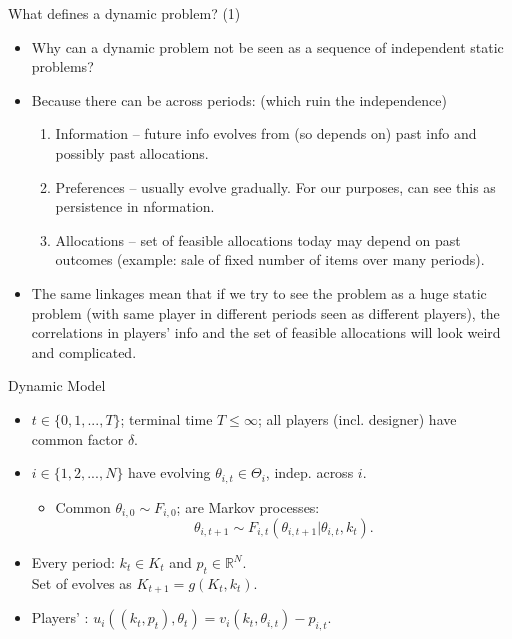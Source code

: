 \documentclass[english,10pt
,aspectratio=169
]{beamer}
\begin{document}
\begin{frame}{What defines a dynamic problem? (1)}
\begin{itemize}
	\item Why can a dynamic problem not be seen as a sequence of independent static problems? 
	
	\item Because there can be  across periods: (which ruin the independence)
	\begin{enumerate}
		\item \alert{Information} -- future info evolves from (so depends on) past info and possibly past allocations.
		\item \alert{Preferences} -- usually evolve gradually. For our purposes, can see this as persistence in nformation.
		\item \alert{Allocations} -- set of feasible allocations today may depend on past outcomes (example: sale of fixed number of items over many periods).
	\end{enumerate}

	\item The same linkages mean that if we try to see the problem as a huge static problem (with same player in different periods seen as different players), the correlations in players' info and the set of feasible allocations will look weird and complicated.
\end{itemize}
\end{frame}


\begin{frame}{Dynamic Model}
\begin{itemize}
	\item {} $t \in \{0,1,...,T\}$; terminal time $T \leq \infty$; all players (incl. designer) have common  factor $\delta$.
	\item {} $i \in \{1,2,...,N\}$ have evolving  $\theta_{i,t} \in \Theta_i$, \alert{indep}. across $i$.
	\begin{itemize}
		\item Common  $\theta_{i,0} \sim F_{i,0}$;  are Markov processes: $$\theta_{i,t+1} \sim F_{i,t}(\theta_{i,t+1} | \theta_{i,t},k_t).$$
	\end{itemize}
	\item Every period:  $k_t \in K_t$ and  $p_t \in \mathbb{R}^N$.
	\\ Set of  evolves as $K_{t+1} = g(K_t,k_t)$.
	\item Players' : $u_i((k_t,p_t),\theta_t) = v_i(k_t,\theta_{i,t}) - p_{i,t}$.
\end{itemize}
\end{frame}
\end{document}
